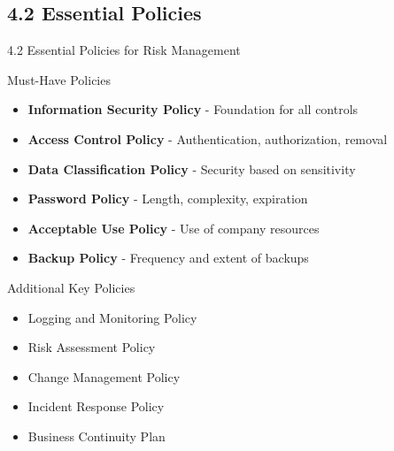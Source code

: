 \documentclass[10pt]{beamer}  %
\begin{document}
	\subsection{4.2 Essential Policies}
	\begin{frame}{4.2 Essential Policies for Risk Management}
		\begin{block}{Must-Have Policies}
			\begin{itemize}
				\item \textbf{Information Security Policy} - Foundation for all controls
				\item \textbf{Access Control Policy} - Authentication, authorization, removal
				\item \textbf{Data Classification Policy} - Security based on sensitivity
				\item \textbf{Password Policy} - Length, complexity, expiration
				\item \textbf{Acceptable Use Policy} - Use of company resources
				\item \textbf{Backup Policy} - Frequency and extent of backups
			\end{itemize}
		\end{block}
		
		\begin{block}{Additional Key Policies}
			\begin{itemize}
				\item Logging and Monitoring Policy
				\item Risk Assessment Policy
				\item Change Management Policy
				\item Incident Response Policy
				\item Business Continuity Plan
			\end{itemize}
		\end{block}
	\end{frame}
	
\end{document}
